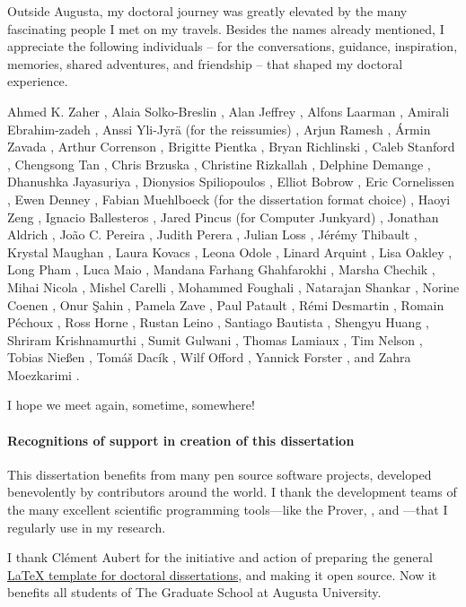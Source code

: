 Outside Augusta, my doctoral journey was greatly elevated by the many fascinating people I met on my travels.
Besides the names already mentioned, I appreciate the following individuals %
-- for the conversations, guidance, inspiration, memories, shared adventures, and friendship --
that shaped my doctoral experience.

Ahmed K. Zaher%
, Alaia Solko-Breslin%
, Alan Jeffrey%
, Alfons Laarman%
, Amirali Ebrahim\hyp{}zadeh%
, Anssi Yli-Jyrä (for the reissumies)%
, Arjun Ramesh%
, Ármin Zavada%
, Arthur Correnson%
, Brigitte Pientka%
, Bryan Richlinski%
, Caleb Stanford%
, Chengsong Tan%
, Chris Brzuska%
, Christine Rizkallah%
, Delphine Demange%
, Dhanushka Jayasuriya%
, Dionysios Spiliopoulos%
, Elliot Bobrow%
, Eric Cornelissen%
, Ewen Denney%
, Fabian Muehlboeck (for the dissertation format choice)%
, Haoyi Zeng%
, Ignacio Ballesteros%
, Jared Pincus (for Computer Junkyard)%
, Jonathan Aldrich%
, João C. Pereira%
, Judith Perera%
, Julian Loss%
, Jérémy Thibault%
, Krystal Maughan%
, Laura Kovacs%
, Leona Odole%
, Linard Arquint%
, Lisa Oakley%
, Long Pham%
, Luca Maio%
, Mandana Farhang Ghahfarokhi%
, Marsha Chechik%
, Mihai Nicola%
, Mishel Carelli%
, Mohammed Foughali%
, Natarajan Shankar%
, Norine Coenen%
, Onur Şahin%
, Pamela Zave%
, Paul Patault%
, Rémi Desmartin%
, Romain Péchoux%
, Ross Horne%
, Rustan Leino%
, Santiago Bautista%
, Shengyu Huang%
, Shriram Krishnamurthi%
, Sumit Gulwani%
, Thomas Lamiaux%
, Tim Nelson%
, Tobias Nießen%
, Tomáš Dacík%
, Wilf Offord%
, Yannick Forster%
, and Zahra Moezkarimi%
.

I hope we meet again, sometime, somewhere!

\paragraph*{Recognitions of support in creation of this dissertation}
This dissertation benefits from many pen source software projects, developed benevolently by contributors around the world.
I thank the development teams of the many excellent scientific programming tools---like the  Prover, , and ---that I regularly use in my research.

I thank Clément Aubert for the initiative and action of preparing the general \href{https://github.com/the-au-forml-lab/au_ccs_dissertation_template}{\LaTeX{ }template for doctoral dissertations},
and making it open source.
Now it benefits all students of The Graduate School at Augusta University.


